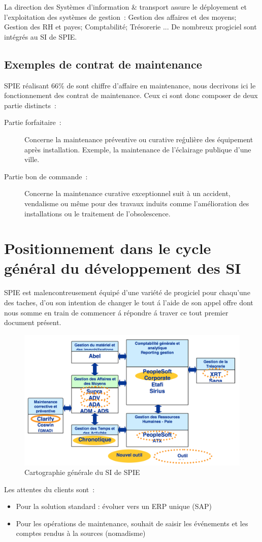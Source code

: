 La direction des Syst\`emes d’information \& transport assure le d\'eployement et l’exploitation des syst\`emes de
gestion~: Gestion des affaires et des moyens; Gestion des RH et payes; Comptabilit\'e; Tr\'esorerie ... De nombreux
progiciel sont int\'egr\'es au SI de SPIE.

\subsection{Exemples de contrat de maintenance}

SPIE r\'ealisant 66\% de sont chiffre d'affaire en maintenance, nous decrivons ici le fonctionnement des contrat de
maintenance. Ceux ci sont donc composer de deux partie distincts~:

\begin{description}
    \item[Partie forfaitaire~:] Concerne la maintenance pr\'eventive ou curative re\'guli\`ere des \'equipement
    apr\`es installation. Exemple, la maintenance de l'\'eclairage publique d'une ville.

    \item[Partie bon de commande~:] Concerne la maintenance curative exceptionnel suit \`a un accident, vendalisme ou
    m\^eme pour des travaux induits comme l'am\'elioration des installations ou le traitement de l’obsolescence.
\end{description}


\pagebreak
\section{Positionnement dans le cycle g\'en\'eral du d\'eveloppement des SI}

SPIE est malencontreusement \'equip\'e d'une vari\'et\'e de progiciel pour chaqu'une des taches, d'ou son intention
de changer le tout \'a l'aide de son appel offre dont nous somme en train de commencer \'a r\'epondre \'a
traver ce tout premier document pr\'esent.

\begin{figure}[h]
    \centering
    \includegraphics[width=140mm]{A_SI_actuelles.png}
    \caption{Cartographie g\'en\'erale du SI de SPIE}
    \label{diagram:si_map}
\end{figure}

Les attentes du clients sont~:

\begin{itemize}
    \item Pour la solution standard : \'evoluer vers un ERP unique (SAP)
    \item Pour les op\'erations de maintenance, souhait de saisir les \'ev\'enements et les comptes rendus \`a la
    sources (nomadisme)
\end{itemize}

